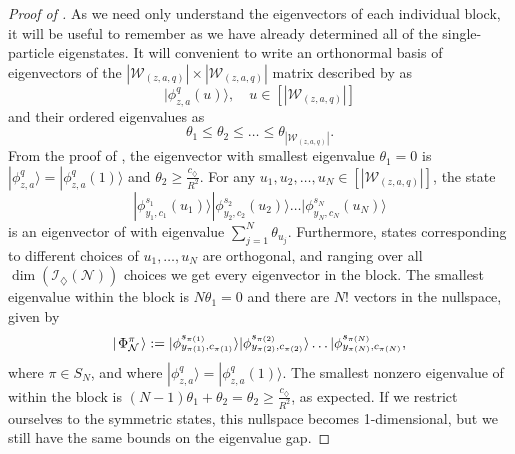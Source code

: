 \documentclass[../thesis-main/thesis-main]{subfiles}
\begin{document}
\begin{proof}[Proof of \protect{}]
As we need only understand the eigenvectors of each individual block, it will be useful to remember  as we have already determined all of the single-particle eigenstates.  It will convenient to write an orthonormal basis of eigenvectors of the $|\mathcal{W}_{(z,a,q)}|\times|\mathcal{W}_{(z,a,q)}|$ matrix described by  as 
\begin{equation}
|\phi_{z,a}^{q}(u)\rangle, \quad u\in[|\mathcal{W}_{(z,a,q)}|]\label{eq:phi_u}
\end{equation}
and their ordered eigenvalues as
\begin{equation}
\theta_{1}\leq\theta_{2}\leq\ldots\leq\theta_{|\mathcal{W}_{(z,a,q)}|}.
\end{equation}
From the proof of , the eigenvector with smallest eigenvalue $\theta_{1}=0$ is $|\phi_{z,a}^{q}\rangle=|\phi_{z,a}^{q}(1)\rangle$ and $\theta_{2}\geq\frac{c_{\diamondsuit}}{R^{2}}$. For any $u_{1},u_{2},\ldots,u_{N}\in [|\mathcal{W}_{(z,a,q)}|]$, the state 
\begin{equation}
|\phi_{y_{1},c_{1}}^{s_{1}}(u_{1})\rangle|\phi_{y_{2},c_{2}}^{s_{2}}(u_{2})\rangle\ldots|\phi_{y_{N},c_{N}}^{s_{N}}(u_{N})\rangle
\end{equation}
is an eigenvector of  with eigenvalue $\sum_{j=1}^{N}\theta_{u_j}.$ Furthermore, states corresponding to different choices of $u_{1},\ldots,u_{N}$ are orthogonal, and ranging over all $\dim(\mathcal{I}_{\diamondsuit}(\mathcal{N}))$ choices we get every eigenvector in the block. The smallest eigenvalue within the block is $N\theta_{1}=0$ and there are $N!$ vectors in the nullspace, given by
\begin{equation}
  |\mspace{2mu} \Phi_\mathcal{N}^{\pi} \mspace{2mu} \rangle := |\phi_{y_{\pi(1)},c_{\pi(1)}}^{s_{\pi(1)}}\rangle|\phi_{y_{\pi(2)},c_{\pi(2)}}^{s_{\pi(2)}}\rangle\ldots|\phi_{y_{\pi(N)},c_{\pi(N)}}^{s_{\pi(N)}},\label{eq:vector_type1}
\end{equation}
where $\pi \in S_N$, and where $|\phi_{z,a}^{q}\rangle=|\phi_{z,a}^{q}(1)\rangle$. The smallest nonzero eigenvalue of  within the block is $(N-1)\theta_{1}+\theta_{2}=\theta_{2}\geq\frac{c_{\diamondsuit}}{R^{2}}$, as expected.  If we restrict ourselves to the symmetric states, this nullspace becomes 1-dimensional, but we still have the same bounds on the eigenvalue gap.


\end{proof}
\end{document}
